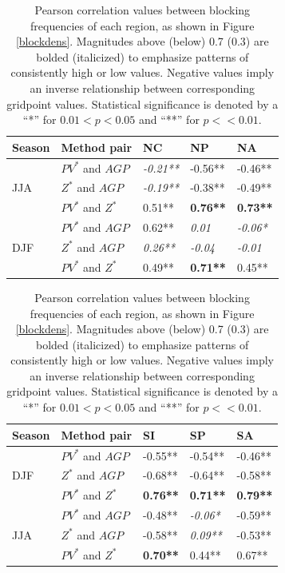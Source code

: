 \documentclass[smallextended]{svjour3}       %
\numberwithin{equation}{section}
\begin{document}

\begin{table}
\centering
\caption{Pearson correlation values between blocking frequencies of each region, as shown in Figure \ref{blockdens}. {\color{blue} Magnitudes above (below) 0.7 (0.3) are bolded (italicized) to emphasize patterns of consistently high or low values. Negative values imply an inverse relationship between corresponding gridpoint values. Statistical significance is denoted by a ``*'' for $0.01<p<0.05$ and ``**'' for $p<<0.01$.}}
\label{pearsontabcol}
\begin{tabular}{|l|l|l|l|l|}
\hline
 Season & Method pair & NC    & NP    & NA   \\ \hline
\multirow{3}{*}{JJA} 
   & $PV^* $ and $AGP$  & \textit{-0.21**} & -0.56** & -0.46** \\ 
   & $Z^*$ and $AGP$  & \textit{-0.19**} & -0.38** & -0.49** \\  
   & $PV^*$ and $Z^*$  & 0.51** & \textbf{0.76**} & \textbf{0.73**} \\ 
   \hline
\multirow{3}{*}{DJF}
  & $PV^*$ and $AGP$ & 0.62** & \textit{0.01} &\textit{ -0.06*} \\  
  & $Z^*$ and $AGP$  & \textit{0.26**}& \textit{-0.04}& \textit{-0.01}  \\ 
  & $PV^*$ and $Z^*$  & 0.49** & \textbf{0.71**} & 0.45**  \\   \hline
\end{tabular}
\begin{tabular}{|l|l|l|l|l|}
\hline
 Season & Method pair &  SI    & SP    & SA    \\ \hline

\multirow{3}{*}{DJF}
  & $PV^*$ and $AGP$  & -0.55**&-0.54** & -0.46**\\  
  & $Z^*$ and $AGP$   & -0.68**& -0.64** & -0.58**\\ 
  & $PV^*$ and $Z^*$  & \textbf{0.76**} & \textbf{0.71**} & \textbf{0.79**} \\   \hline
  
  \multirow{3}{*}{JJA} 
   & $PV^* $ and $AGP$  & -0.48** & \textit{-0.06*} & -0.59**\\ 
   & $Z^*$ and $AGP$  & -0.58** & \textit{0.09**} & {-0.53**} \\  
   & $PV^*$ and $Z^*$  & \textbf{0.70**} & {0.44**} & {0.67**} \\ 
   \hline
\end{tabular}
\end{table}
\end{document}
